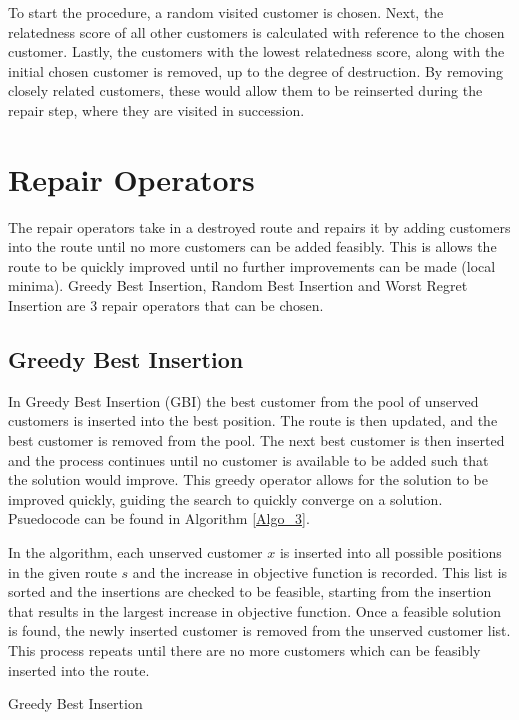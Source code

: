 To start the procedure, a random visited customer is chosen. Next, the relatedness score of all other customers is calculated with reference to the chosen customer. Lastly, the customers with the lowest relatedness score, along with the initial chosen customer is removed, up to the degree of destruction. By removing closely related customers, these would allow them to be reinserted during the repair step, where they are visited in succession.

\section{Repair Operators}
The repair operators take in a destroyed route and repairs it by adding customers into the route until no more customers can be added feasibly. This is allows the route to be quickly improved until no further improvements can be made (local minima). Greedy Best Insertion, Random Best Insertion and Worst Regret Insertion are 3 repair operators that can be chosen. \\

\subsection{Greedy Best Insertion}
In Greedy Best Insertion (GBI) the best customer from the pool of unserved customers is inserted into the best position. The route is then updated, and the best customer is removed from the pool. The next best customer is then inserted and the process continues until no customer is available to be added such that the solution would improve. This greedy operator allows for the solution to be improved quickly, guiding the search to quickly converge on a solution. Psuedocode can be found in Algorithm \ref{Algo_3}. 

In the algorithm, each unserved customer $x$ is inserted into all possible positions in the given route $s$ and the increase in objective function is recorded. This list is sorted and the insertions are checked to be feasible, starting from the insertion that results in the largest increase in objective function. Once a feasible solution is found, the newly inserted customer is removed from the unserved customer list. This process repeats until there are no more customers which can be feasibly inserted into the route. 

\begin{algorithm} 

\BlankLine


\caption{Greedy Best Insertion} \label{Algo_3}
\end{algorithm}

